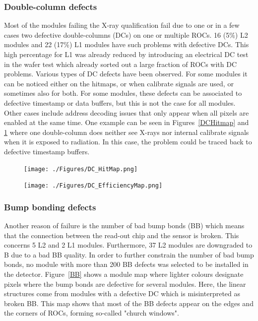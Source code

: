 \documentclass[a4paper,12pt,twoside]{article}
\begin{document}
\subsubsection{Double-column defects}
Most of the modules failing the X-ray qualification fail due to one or in a few cases two defective double-columns (DCs) on one or multiple ROCs. 16 (5\%) L2 modules and 22 (17\%) L1 modules have such problems with defective DCs. This high percentage for L1 was already reduced by introducing an electrical DC test in the wafer test which already sorted out a large fraction of ROCs with DC problems. Various types of DC defects have been observed. For some modules it can be noticed either on the hitmaps, or when calibrate signals are used, or sometimes also for both. For some modules, these defects can be associated to defective timestamp or data buffers, but this is not the case for all modules. Other cases include address decoding issues that only appear when all pixels are enabled at the same time. One example can be seen in Figures~\ref{DCHitmap} and \ref{DCEfficiencymap} where one double-column does neither see X-rays nor internal calibrate signals when it is exposed to radiation. In this case, the problem could be traced back to defective timestamp buffers.

\begin{figure} [h!]
\centering
\begin{minipage}{.48\textwidth}
  \centering
  \texttt{[image: ./Figures/DC\_HitMap.png]}
  \label{DCHitmap}
\end{minipage}%
\hspace{2mm}
\begin{minipage}{.48\textwidth}
  \centering
  \texttt{[image: ./Figures/DC\_EfficiencyMap.png]}
  \label{DCEfficiencymap}
\end{minipage}
\end{figure}

\subsubsection{Bump bonding defects}
Another reason of failure is the number of bad bump bonds (BB) which means that the connection between the read-out chip and the sensor is broken. This concerns 5 L2 and 2 L1 modules. Furthermore, 37 L2 modules are downgraded to B due to a bad BB quality. In order to further constrain the number of bad bump bonds, no module with more than 200 BB defects was selected to be installed in the detector. Figure~\ref{BB} shows a module map where lighter colours designate pixels where the bump bonds are defective for several modules. Here, the linear structures come from modules with a defective DC which is misinterpreted as broken BB. This map shows that most of the BB defects appear on the edges and the corners of ROCs, forming so-called "church windows". 
\end{document}
